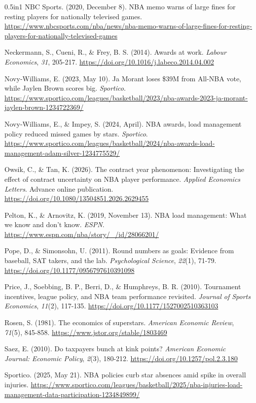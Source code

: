 \documentclass[12pt]{article}
\begin{document}
\begin{hangparas}{0.5in}{1}
NBC Sports. (2020, December 8). NBA memo warns of large fines for resting players for nationally televised games. \url{https://www.nbcsports.com/nba/news/nba-memo-warns-of-large-fines-for-resting-players-for-nationally-televised-games}

Neckermann, S., Cueni, R., \& Frey, B. S. (2014). Awards at work. \emph{Labour Economics}, \emph{31}, 205-217. \url{https://doi.org/10.1016/j.labeco.2014.04.002}

Novy-Williams, E. (2023, May 10). Ja Morant loses \$39M from All-NBA vote, while Jaylen Brown scores big. \emph{Sportico}. \url{https://www.sportico.com/leagues/basketball/2023/nba-awards-2023-ja-morant-jaylen-brown-1234722369/}

Novy-Williams, E., \& Impey, S. (2024, April). NBA awards, load management policy reduced missed games by stars. \emph{Sportico}. \url{https://www.sportico.com/leagues/basketball/2024/nba-awards-load-management-adam-silver-1234775529/}

Owsik, C., \& Tan, K. (2026). The contract year phenomenon: Investigating the effect of contract uncertainty on NBA player performance. \emph{Applied Economics Letters}. Advance online publication. \url{https://doi.org/10.1080/13504851.2026.2629455}

Pelton, K., \& Arnovitz, K. (2019, November 13). NBA load management: What we know and don't know. \emph{ESPN}. \url{https://www.espn.com/nba/story/_/id/28066201/}

Pope, D., \& Simonsohn, U. (2011). Round numbers as goals: Evidence from baseball, SAT takers, and the lab. \emph{Psychological Science}, \emph{22}(1), 71-79. \url{https://doi.org/10.1177/0956797610391098}

Price, J., Soebbing, B. P., Berri, D., \& Humphreys, B. R. (2010). Tournament incentives, league policy, and NBA team performance revisited. \emph{Journal of Sports Economics}, \emph{11}(2), 117-135. \url{https://doi.org/10.1177/1527002510363103}

Rosen, S. (1981). The economics of superstars. \emph{American Economic Review}, \emph{71}(5), 845-858. \url{https://www.jstor.org/stable/1803469}

Saez, E. (2010). Do taxpayers bunch at kink points? \emph{American Economic Journal: Economic Policy}, \emph{2}(3), 180-212. \url{https://doi.org/10.1257/pol.2.3.180}

Sportico. (2025, May 21). NBA policies curb star absences amid spike in overall injuries. \url{https://www.sportico.com/leagues/basketball/2025/nba-injuries-load-management-data-participation-1234849899/}


\end{hangparas}
\end{document}
